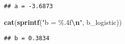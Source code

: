 \documentclass[
]{article}
\newenvironment{Shaded}{\begin{snugshade}}{\end{snugshade}}
\newcommand{\AttributeTok}[1]{\textcolor[rgb]{0.13,0.29,0.53}{#1}}
\newcommand{\CommentTok}[1]{\textcolor[rgb]{0.56,0.35,0.01}{\textit{#1}}}
\newcommand{\DecValTok}[1]{\textcolor[rgb]{0.00,0.00,0.81}{#1}}
\newcommand{\FloatTok}[1]{\textcolor[rgb]{0.00,0.00,0.81}{#1}}
\newcommand{\FunctionTok}[1]{\textcolor[rgb]{0.13,0.29,0.53}{\textbf{#1}}}
\newcommand{\NormalTok}[1]{#1}
\newcommand{\OtherTok}[1]{\textcolor[rgb]{0.56,0.35,0.01}{#1}}
\newcommand{\SpecialCharTok}[1]{\textcolor[rgb]{0.81,0.36,0.00}{\textbf{#1}}}
\newcommand{\StringTok}[1]{\textcolor[rgb]{0.31,0.60,0.02}{#1}}
\begin{document}
\begin{verbatim}
## a = -3.6873
\end{verbatim}

\begin{Shaded}
\begin{Highlighting}[]
\FunctionTok{cat}\NormalTok{(}\FunctionTok{sprintf}\NormalTok{(}\StringTok{"b = \%.4f}\SpecialCharTok{\textbackslash{}n}\StringTok{"}\NormalTok{, b\_logistic))}
\end{Highlighting}
\end{Shaded}

\begin{verbatim}
## b = 0.3834
\end{verbatim}

\begin{Shaded}
\end{Shaded}
\end{document}
